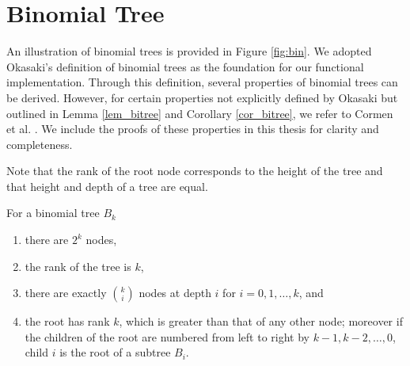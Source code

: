 \documentclass{clmthesis}
\begin{document}
\section{Binomial Tree}\label{sec:bitree}
An illustration of binomial trees is provided in Figure \ref{fig:bin}.
We adopted Okasaki's definition of binomial trees \cite{okasaki1999} as the foundation for our functional implementation. Through this definition, several properties of binomial trees can be derived.
However, for certain properties not explicitly defined by Okasaki \cite{okasaki1999} but outlined in Lemma \ref{lem_bitree} and Corollary \ref{cor_bitree}, we refer to Cormen et al. \cite{thomas2022}. We include the proofs of these properties in this thesis for clarity and completeness.


Note that the rank of the root node corresponds to the height of the tree and that height and depth of a tree are equal.

\lemma\label{lem_bitree}{For a binomial tree $B_k$ %
\begin{enumerate}
	\item there are $2^k$ nodes,
	\item the rank of the tree is $k$,
	\item there are exactly $k \choose i$ nodes at depth $i$ for $i = 0, 1,\dots ,k$, and
	\item the root has rank $k$, which is greater than that of any other node; moreover if
	the children of the root are numbered from left to right by $k-1, k-2, \dots, 0$,
	child $i$ is the root of a subtree $B_i$.
\end{enumerate}}
\end{document}
